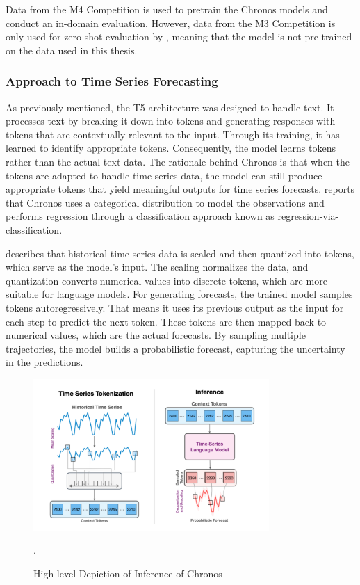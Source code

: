 \documentclass[12pt,a4paper]{article}
\begin{document}
Data from the M4 Competition is used to pretrain the Chronos models and conduct an in-domain evaluation. However, data from the M3 Competition is only used for zero-shot evaluation by \cite{ansari2024chronos}, meaning that the model is not pre-trained on the data used in this thesis.

\subsubsection{Approach to Time Series Forecasting}

As previously mentioned, the T5 architecture was designed to handle text. It processes text by breaking it down into tokens and generating responses with tokens that are contextually relevant to the input. Through its training, it has learned to identify appropriate tokens. Consequently, the model learns tokens rather than the actual text data. The rationale behind Chronos is that when the tokens are adapted to handle time series data, the model can still produce appropriate tokens that yield meaningful outputs for time series forecasts. \cite{ansari2024chronos} reports that Chronos uses a categorical distribution to model the observations and performs regression through a classification approach known as regression-via-classification.

\cite{ansari2024chronos} describes that historical time series data is scaled and then quantized into tokens, which serve as the model's input. The scaling normalizes the data, and quantization converts numerical values into discrete tokens, which are more suitable for language models. For generating forecasts, the trained model samples tokens autoregressively. That means it uses its previous output as the input for each step to predict the next token. These tokens are then mapped back to numerical values, which are the actual forecasts. By sampling multiple trajectories, the model builds a probabilistic forecast, capturing the uncertainty in the predictions.

\begin{figure}[htbp]
  \centering
  \includegraphics[width=0.8\textwidth]{chronos_inference.png}
  \caption{High-level Depiction of Inference of Chronos \parencite{ansari2024chronos}}.
  \label{chronosinference}
\end{figure}
\end{document}
